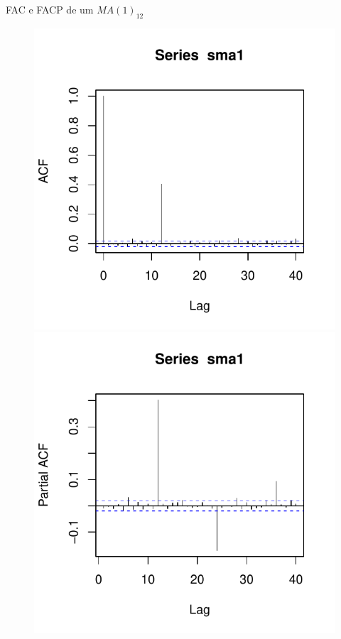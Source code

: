 \documentclass[11pt]{beamer}
\begin{document}
\begin{frame}{FAC e FACP de um $MA(1)_{12}$}
	
	\begin{figure}
		\includegraphics[scale=0.55]{graficos/fac_sma1.pdf} 		\includegraphics[scale=0.55]{graficos/facp_sma1.pdf}
	\end{figure}
\end{frame}
\end{document}
